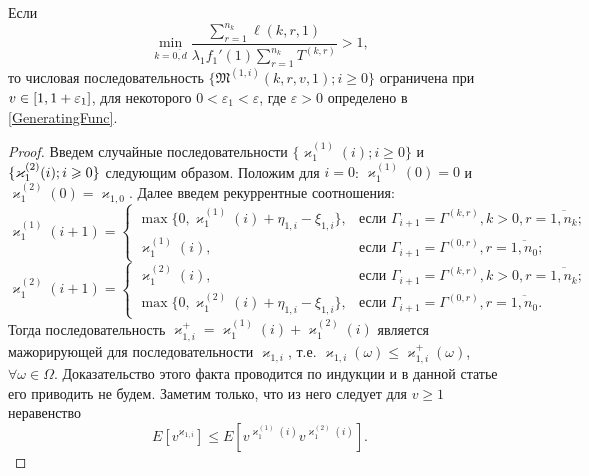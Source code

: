 \documentclass[a4paper,12pt,russian]{extarticle}
\begin{document}
\begin{lemma}
Если 
$$
\min_{k=\overline{0,d}} { \frac{\sum_{r = 1}^{n_k} \ell(k,r,1) }{\lambda_1 f_1'(1) \sum_{r=1}^{n_k} T^{(k,r)} }}>1,
$$
то числовая последовательность $\{\mathfrak{M}^{(1,i)}(k,r,v,1); i\geqslant 0\}$ ограничена при $v \hm\in [1, 1+\varepsilon_1]$, для некоторого $ 0 < \varepsilon_1 < \varepsilon$, где $\varepsilon>0$ определено в \eqref{GeneratingFunc}.
\label{generating:1:limited}
\end{lemma}
\begin{proof}
 Введем случайные последовательности $\{\varkappa_{1}^{(1)}(i); i\geqslant0\}$ и $\{\varkappa_{1}^{(2)}(i); i \hm\geqslant 0\}$ следующим образом. Положим для $i=0$: $\varkappa_{1}^{(1)}(0)=0$ и $\varkappa_{1}^{(2)}(0)=\varkappa_{1,0}$. Далее введем рекуррентные соотношения:  
\begin{equation*}
  \varkappa_{1}^{(1)}(i+1) =
  \begin{cases}
    \max{\{0,\varkappa_{1}^{(1)}(i) + \eta_{1,i} - \xi_{1,i}\}},&  \text{если } \Gamma_{i+1}=\Gamma^{(k,r)}, k>0, r=\overline{1,n_k}; \\
    \varkappa_{1}^{(1)}(i),&  \text{если } \Gamma_{i+1}=\Gamma^{(0,r)}, r=\overline{1,n_0};
  \end{cases}
\end{equation*}
\begin{equation*}
  \varkappa_{1}^{(2)}(i+1) =
  \begin{cases}
    \varkappa_{1}^{(2)}(i),&  \text{если } \Gamma_{i+1}=\Gamma^{(k,r)}, k>0, r=\overline{1,n_k};\\
    \max{\{0,\varkappa_{1}^{(2)}(i) + \eta_{1,i} - \xi_{1,i}\}},&  \text{если } \Gamma_{i+1}=\Gamma^{(0,r)}, r=\overline{1,n_0}.
  \end{cases}
\end{equation*}
Тогда последовательность $\varkappa_{1,i}^+=\varkappa_{1}^{(1)}(i) + \varkappa_{1}^{(2)}(i)$ является мажорирующей для последовательности $\varkappa_{1,i}$, т.е. $\varkappa_{1,i}(\omega) \leqslant \varkappa_{1,i}^+(\omega)$, $\forall \omega \in \Omega$. Доказательство этого факта проводится по индукции и в данной статье его приводить не будем. Заметим только, что из него следует для $v\geqslant 1$ неравенство
\begin{equation}
E[v^{\varkappa_{1,i}}]\leqslant E[v^{\varkappa_{1}^{(1)}(i)} v^{\varkappa_{1}^{(2)}(i)}].
\label{cenzor:estimate}
\end{equation}
                               


\end{proof}
\end{document}
